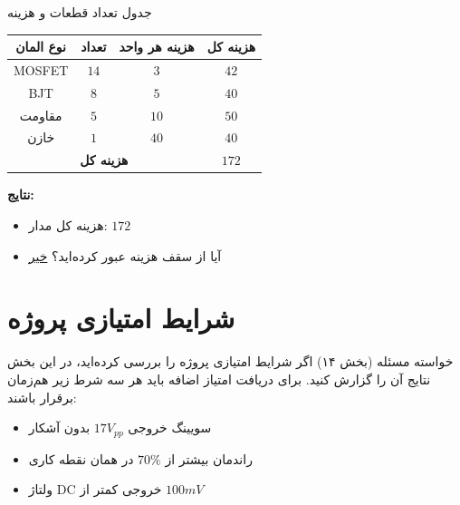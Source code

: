 \documentclass[12pt,a4paper]{article}
\begin{document}
\begin{answerbox}{جدول تعداد قطعات و هزینه}
\begin{center}
\begin{tabular}{|c|c|c|c|}
\hline
\textbf{نوع المان} & \textbf{تعداد} & \textbf{هزینه هر واحد} & \textbf{هزینه کل} \\
\hline
MOSFET & $14$ & $3$ & $42$ \\
\hline
BJT & $8$ & $5$ & $40$ \\
\hline
مقاومت & $5$ & $10$ &$50$ \\
\hline
خازن & $1$ & $40$ &$40$\\
\hline
\multicolumn{3}{|c|}{\textbf{هزینه کل}} &$172$ \\
\hline
\end{tabular}
\end{center}

\vspace{1cm}

\textbf{نتایج:}
\begin{itemize}
    \item هزینه کل مدار: \underline{$172$}
    \item آیا از سقف هزینه عبور کرده‌اید؟ \underline{خیر}
\end{itemize}

\vspace{4cm}
\end{answerbox}

\newpage

\section{شرایط امتیازی پروژه}

\begin{taskbox}{خواسته مسئله (بخش ۱۴)}
اگر شرایط امتیازی پروژه را بررسی کرده‌اید، در این بخش نتایج آن را گزارش کنید. برای دریافت امتیاز اضافه باید هر سه شرط زیر هم‌زمان برقرار باشند:
\begin{itemize}
    \item سویینگ خروجی $17V_{pp}$ بدون  آشکار
    \item راندمان بیشتر از $70\%$ در همان نقطه کاری
    \item ولتاژ DC خروجی کمتر از $100mV$
\end{itemize}
\end{taskbox}
\end{document}
